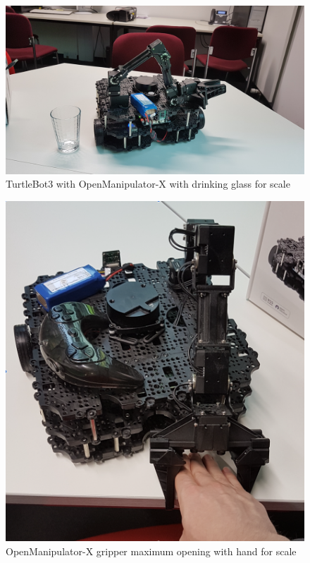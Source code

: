 \documentclass[plainarticle,zihtitle,english,final,hyperref,utf8]{zihpub}
\begin{document}
\begin{figure}[h!]
  \begin{center}
    \includegraphics[width=.6\textwidth]{TurtleDimensions.jpg}
    \caption{TurtleBot3 with OpenManipulator-X with drinking glass for scale}
    \label{fig:turtle}
  \end{center}
\end{figure}

\begin{figure}[h!]
  \begin{center}
    \includegraphics[width=.6\textwidth]{ArmSpannHandQuadrat.png}
    \caption{OpenManipulator-X gripper maximum opening with hand for scale}
    \label{fig:arm}
  \end{center}
\end{figure}


\clearpage
\end{document}
